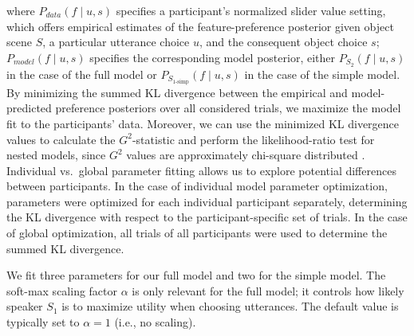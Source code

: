 \documentclass[11pt,a4paper]{article}
\begin{document}
\noindent where $P_{data}(f\mid u,s)$ specifies a participant's normalized slider value setting, which offers empirical estimates of the feature-preference posterior given object scene $S$, a particular utterance choice $u$, and the consequent object choice $s$;
$P_{model}(f\mid u,s)$ specifies the corresponding model posterior, either $P_{S_{2}}(f\mid u,s)$ in the case of the full model or $P_{S_{1\textrm{-simp}}}(f\mid u,s)$ in the case of the simple model. 
By minimizing the summed KL divergence between the empirical and model-predicted preference posteriors over all considered trials, we maximize the model fit to the participants' data. 
Moreover, we can use the minimized KL divergence values to calculate the $G^2$-statistic and perform the likelihood-ratio test for nested models, since $G^2$ values are approximately chi-square distributed \cite{Lewandowsky:2011}. 
Individual vs.~global parameter fitting allows us to explore potential differences between participants.
In the case of individual model parameter optimization, parameters were optimized for each individual participant separately, determining the KL divergence with respect to the participant-specific set of trials. 
In the case of global optimization, all trials of all participants were used to determine the summed KL divergence.

We fit three parameters for our full model and two for the simple model.
The soft-max scaling factor $\alpha$ is only relevant for the full model; it  controls how likely speaker $S_1$ is to maximize utility when choosing utterances. 
The default value is typically set to $\alpha=1$ (i.e., no scaling). 
\end{document}
